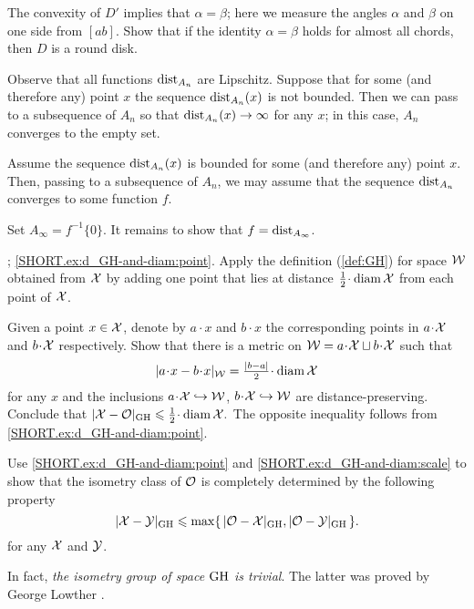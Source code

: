 The convexity of $D'$ implies that $\alpha=\beta$;
here we measure the angles $\alpha$ and $\beta$ on one side from $[ab]$.
Show that if the identity $\alpha=\beta$ holds for almost all chords, then $D$ is a round disk. 


Observe that all functions $\mathrm{dist}_{A_n}$ are Lipschitz.
Suppose that for some (and therefore any) point $x$ the sequence $\mathrm{dist}_{A_n}(x)$ is not bounded.
Then we can pass to a subsequence of $A_n$ so that $\mathrm{dist}_{A_n}(x)\to\infty$ for any $x$;
in this case, $A_n$ converges to the empty set.

Assume the sequence $\mathrm{dist}_{A_n}(x)$ is bounded for some (and therefore any) point $x$.
Then, passing to a subsequence of $A_n$, we may assume that the sequence $\mathrm{dist}_{A_n}$ converges to some function $f$.

Set $A_\infty=f^{-1}\{0\}$.
It remains to show that $f=\mathrm{dist}_{A_\infty}$.


\parbf{\ref{ex:d_GH-and-diam}};
\ref{SHORT.ex:d_GH-and-diam:point}.
Apply the definition (\ref{def:GH}) for space $\mathcal{W}$ obtained from $\mathcal{X}$ by adding one point that lies at distance $\tfrac12\cdot\diam \spc{X}$ from each point of $\mathcal{X}$.

Given a point $x\in\mathcal{X}$, denote by $a\cdot x$ and $b\cdot x$ the corresponding points in $a\cdot\spc{X}$ and $b\cdot \spc{X}$ respectively.
Show that there is a metric on $\spc{W}\z=a\cdot\spc{X}\sqcup b\cdot\spc{X}$ such that 
\[|a\cdot x-b\cdot x|_{\spc{W}}=\tfrac{|b-a|}2\cdot\diam\spc{X}\]
for any $x$ and the inclusions
$a\cdot\spc{X}\z\hookrightarrow\spc{W}$,
$b\cdot\spc{X}\z\hookrightarrow\spc{W}$ are distance-preserving.
Conclude that 
$|\spc{X}-\spc{O}|_{\GH}\le\tfrac12\cdot \diam \spc{X}.$
The opposite inequality follows from \ref{SHORT.ex:d_GH-and-diam:point}.


Use \ref{SHORT.ex:d_GH-and-diam:point} and \ref{SHORT.ex:d_GH-and-diam:scale} to show that the isometry class of $\mathcal{O}$ is completely determined by the following property
\[|\mathcal{X}-\mathcal{Y}|_{\operatorname{\rm GH}\nolimits} \leqslant \max\{\,|\mathcal{O}-\mathcal{X}|_{\operatorname{\rm GH}\nolimits},|\mathcal{O}-\mathcal{Y}|_{\operatorname{\rm GH}\nolimits}\,\}.\]
for any $\mathcal{X}$ and $\mathcal{Y}$.

In fact, \textit{the isometry group of space $\operatorname{\rm GH}\nolimits$ is trivial}.
The latter was proved by George Lowther \cite{lowther, ivanov-tuzhilin}.

